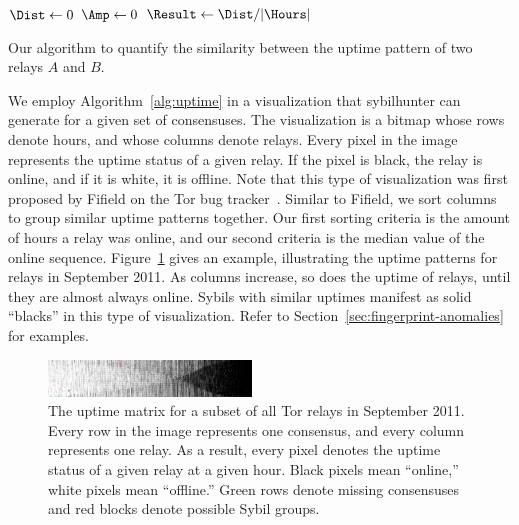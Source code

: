 \begin{algorithm}[t]

\Output{$\Result$}
\BlankLine
$\Dist \leftarrow 0$\;
$\Amp \leftarrow 0$\;
$\Result \leftarrow \Dist / \lvert \Hours \rvert$\;
\caption{Our algorithm to quantify the similarity between the uptime pattern
of two relays $A$ and $B$.}
\label{alg:uptime}
\end{algorithm}

We employ Algorithm~\ref{alg:uptime} in a visualization that sybilhunter can
generate for a given set of consensuses.  The visualization is a bitmap whose
rows denote hours, and whose columns denote relays.  Every pixel in the image
represents the uptime status of a given relay.  If the pixel is black, the relay
is online, and if it is white, it is offline.  Note that this type of
visualization was first proposed by Fifield on the Tor bug
tracker~\cite{Fifield2014a}.  Similar to Fifield, we sort columns to group
similar uptime patterns together.  Our first sorting criteria is the amount of
hours a relay was online, and our second criteria is the median value of the
online sequence.  Figure~\ref{fig:uptime-matrix} gives an example, illustrating
the uptime patterns for relays in September 2011.  As columns increase, so does
the uptime of relays, until they are almost always online.  Sybils with similar
uptimes manifest as solid ``blacks'' in this type of visualization.  Refer to
Section~\ref{sec:fingerprint-anomalies} for examples.

\begin{figure}[t]
	\centering
	\includegraphics[width=0.48\textwidth]{diagrams/2011-09-uptimes-truncated.jpg}
	\caption{The uptime matrix for a subset of all Tor relays in September 2011.
		Every row in the image represents one consensus, and every column
		represents one relay.  As a result, every pixel denotes the uptime
		status of a given relay at a given hour.  Black pixels mean ``online,''
		white pixels mean ``offline.''  Green rows denote missing consensuses
		and red blocks denote possible Sybil groups.}
	\label{fig:uptime-matrix}
\end{figure}

